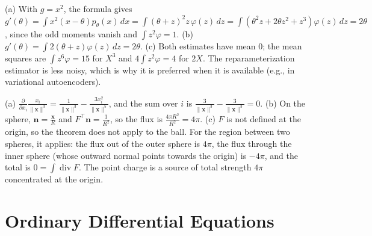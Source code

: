 \documentclass[11pt]{article}
\newcommand{\norm}[1]{\lVert #1 \rVert}
\DeclareMathOperator{\Div}{div}
\begin{document}
\begin{description}[leftmargin=0pt, itemsep=0.3em]
    \item[\ref{pr:score-function}.] (a) With $g = x^2$, the formula gives $g'(\theta) = \int x^2(x - \theta)p_\theta(x)\, dx = \int (\theta + z)^2z\,\varphi(z)\, dz = \int (\theta^2z + 2\theta z^2 + z^3)\varphi(z)\, dz = 2\theta$, since the odd moments vanish and $\int z^2\varphi = 1$. (b) $g'(\theta) = \int 2(\theta + z)\varphi(z)\, dz = 2\theta$. (c) Both estimates have mean $0$; the mean squares are $\int z^6\varphi = 15$ for $X^3$ and $4\int z^2\varphi = 4$ for $2X$. The reparameterization estimator is less noisy, which is why it is preferred when it is available (e.g., in variational autoencoders).
    \item[\ref{pr:coulomb}.] (a) $\frac{\partial}{\partial x_i}\frac{x_i}{\norm{\mathbf{x}}^3} = \frac{1}{\norm{\mathbf{x}}^3} - \frac{3x_i^2}{\norm{\mathbf{x}}^5}$, and the sum over $i$ is $\frac{3}{\norm{\mathbf{x}}^3} - \frac{3}{\norm{\mathbf{x}}^3} = 0$. (b) On the sphere, $\mathbf{n} = \frac{\mathbf{x}}{R}$ and $F^\top\mathbf{n} = \frac{1}{R^2}$, so the flux is $\frac{4\pi R^2}{R^2} = 4\pi$. (c) $F$ is not defined at the origin, so the theorem does not apply to the ball. For the region between two spheres, it applies: the flux out of the outer sphere is $4\pi$, the flux through the inner sphere (whose outward normal points towards the origin) is $-4\pi$, and the total is $0 = \int \Div F$. The point charge is a source of total strength $4\pi$ concentrated at the origin.
\end{description}

\section*{Ordinary Differential Equations}
\end{document}
